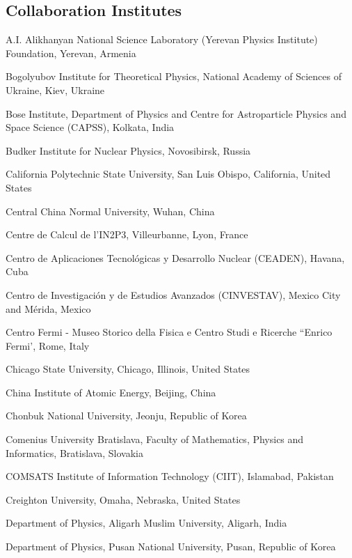\begin{flushleft}
\section*{Collaboration Institutes}
\renewcommand\theenumi{\arabic{enumi}~}
\begin{Authlist}
\item {}A.I. Alikhanyan National Science Laboratory (Yerevan Physics Institute) Foundation, Yerevan, Armenia
\item {}Bogolyubov Institute for Theoretical Physics, National Academy of Sciences of Ukraine, Kiev, Ukraine
\item {}Bose Institute, Department of Physics  and Centre for Astroparticle Physics and Space Science (CAPSS), Kolkata, India
\item {}Budker Institute for Nuclear Physics, Novosibirsk, Russia
\item {}California Polytechnic State University, San Luis Obispo, California, United States
\item {}Central China Normal University, Wuhan, China
\item {}Centre de Calcul de l'IN2P3, Villeurbanne, Lyon, France
\item {}Centro de Aplicaciones Tecnol\'{o}gicas y Desarrollo Nuclear (CEADEN), Havana, Cuba
\item {}Centro de Investigaci\'{o}n y de Estudios Avanzados (CINVESTAV), Mexico City and M\'{e}rida, Mexico
\item {}Centro Fermi - Museo Storico della Fisica e Centro Studi e Ricerche ``Enrico Fermi', Rome, Italy
\item {}Chicago State University, Chicago, Illinois, United States
\item {}China Institute of Atomic Energy, Beijing, China
\item {}Chonbuk National University, Jeonju, Republic of Korea
\item {}Comenius University Bratislava, Faculty of Mathematics, Physics and Informatics, Bratislava, Slovakia
\item {}COMSATS Institute of Information Technology (CIIT), Islamabad, Pakistan
\item {}Creighton University, Omaha, Nebraska, United States
\item {}Department of Physics, Aligarh Muslim University, Aligarh, India
\item {}Department of Physics, Pusan National University, Pusan, Republic of Korea

\end{Authlist}
\end{flushleft}
